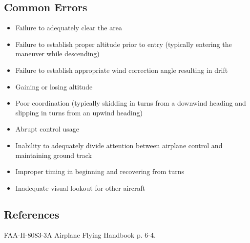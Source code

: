 \subsection{Common Errors}

\begin{itemize}
  \item Failure to adequately clear the area
  \item Failure to establish proper altitude prior to entry (typically entering
    the maneuver while descending)
  \item Failure to establish appropriate wind correction angle resulting in
    drift
  \item Gaining or losing altitude
  \item Poor coordination (typically skidding in turns from a downwind heading
    and slipping in turns from an upwind heading)
  \item Abrupt control usage
  \item Inability to adequately divide attention between airplane control and
    maintaining ground track
  \item Improper timing in beginning and recovering from turns
  \item Inadequate visual lookout for other aircraft
\end{itemize}

\subsection{References}

FAA-H-8083-3A Airplane Flying Handbook p. 6-4.

